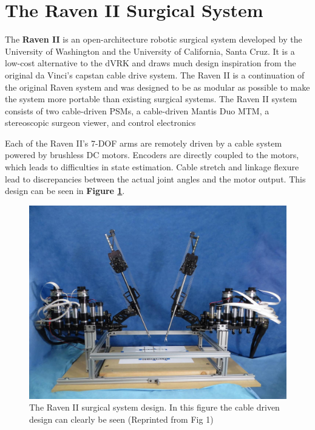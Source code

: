 \section{The Raven II Surgical System}

The \textbf{Raven II} is an open-architecture robotic surgical system developed by the University of Washington and the University of California, Santa Cruz. It is a low-cost alternative to the dVRK and draws much design inspiration from the original da Vinci's capstan cable drive system. The Raven II is a continuation of the original Raven system and was designed to be as modular as possible to make the system more portable than existing surgical systems. The Raven II system consists of two cable-driven PSMs, a cable-driven Mantis Duo MTM, a stereoscopic surgeon viewer, and control electronics


Each of the Raven II's 7-DOF arms are remotely driven by a cable system powered by brushless DC motors. Encoders are directly coupled to the motors, which leads to difficulties in state estimation. Cable stretch and linkage flexure lead to discrepancies between the actual joint angles and the motor output. This design can be seen in \textbf{Figure \ref{fig:ravenII_design}}.

\begin{figure}[h!]
    \centering
    \includegraphics[width=1.0\linewidth]{figures/raven_II.jpg}
    \caption{The Raven II surgical system design. In this figure the cable driven design can clearly be seen (Reprinted from \cite{Hannaford2013RavenII} Fig 1)}
    \label{fig:ravenII_design}
\end{figure}

